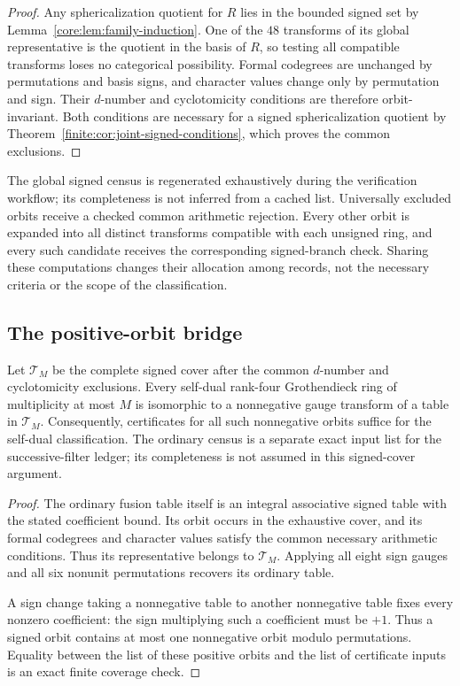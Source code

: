 \begin{proof}
Any sphericalization quotient for $R$ lies in the bounded signed
set by Lemma~\ref{core:lem:family-induction}. One of the $48$ transforms
of its global representative is the quotient in the basis of $R$,
so testing all compatible transforms loses no categorical
possibility. Formal codegrees are unchanged by permutations and
basis signs, and character values change only by permutation and
sign. Their $d$-number and cyclotomicity conditions are therefore
orbit-invariant. Both conditions are necessary for a signed
sphericalization quotient by Theorem~\ref{finite:cor:joint-signed-conditions},
which proves the common exclusions.
\end{proof}

\begin{remark}
The global signed census is regenerated exhaustively during the
verification workflow; its completeness is not inferred from a
cached list. Universally excluded orbits receive a checked common
arithmetic rejection. Every other orbit is expanded into all
distinct transforms compatible with each unsigned ring, and every
such candidate receives the corresponding signed-branch check.
Sharing these computations changes their allocation among records,
not the necessary criteria or the scope of the classification.
\end{remark}

\subsection{The positive-orbit bridge}
\begin{proposition}\label{finite:prop:positive-bridge}
Let $\mathcal T_M$ be the complete signed cover after the common
$d$-number and cyclotomicity exclusions.  Every self-dual rank-four
Grothendieck ring of multiplicity at most $M$ is isomorphic to a
nonnegative gauge transform of a table in $\mathcal T_M$.
Consequently, certificates for all such nonnegative orbits suffice for the
self-dual classification. The ordinary census is a separate exact input list
for the successive-filter ledger; its completeness is not assumed in this
signed-cover argument.
\end{proposition}
\begin{proof}
The ordinary fusion table itself is an integral associative signed table
with the stated coefficient bound.  Its orbit occurs in the exhaustive
cover, and its formal codegrees and character values satisfy the common
necessary arithmetic conditions.  Thus its representative belongs to
$\mathcal T_M$.  Applying all eight sign gauges and all six nonunit
permutations recovers its ordinary table.

A sign change taking a nonnegative table to another nonnegative table
fixes every nonzero coefficient: the sign multiplying such a coefficient
must be $+1$.  Thus a signed orbit contains at most one nonnegative orbit
modulo permutations.  Equality between the list of these positive orbits
and the list of certificate inputs is an exact finite coverage check.
\end{proof}

